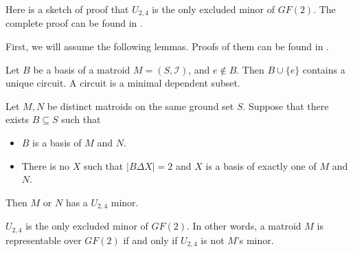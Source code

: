 Here is a sketch of proof that $U_{2, 4}$ is the only excluded minor of $GF(2)$.
The complete proof can be found in \cite{lec9}.

First, we will assume the following lemmas. Proofs of them can be found in \cite{lec9}.

\begin{lem}
Let $B$ be a basis of a matroid $M = (S, \mathcal{I})$, and $e \notin B$.
Then $B \cup \{ e \}$ contains a unique circuit.
A circuit is a minimal dependent subset.
\end{lem}

\begin{lem}
Let $M, N$ be distinct matroids on the same ground set $S$.
Suppose that there exists $B \subseteq S$ such that
\begin{itemize}
\item $B$ is a basis of $M$ and $N$.
\item There is no $X$ such that $\lvert B \Delta X \rvert = 2$ and $X$ is a basis of exactly one of $M$ and $N$.
\end{itemize}
Then $M$ or $N$ has a $U_{2, 4}$ minor.
\end{lem}

\begin{thm}
$U_{2, 4}$ is the only excluded minor of $GF(2)$.
In other words, a matroid $M$ is representable over $GF(2)$ if and only if $U_{2, 4}$ is not $M$'s minor.
\end{thm}


